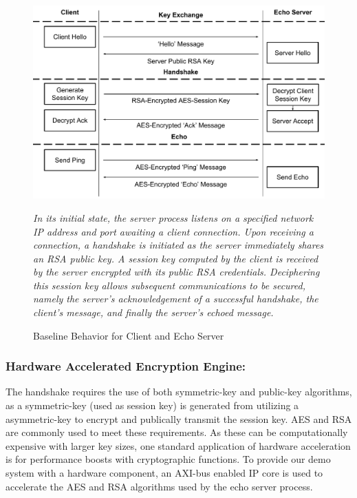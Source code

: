 \documentclass[sigconf]{acmart}
\theoremstyle{plain}
\theoremstyle{remark}
\begin{document}
\begin{figure}[]
\centering
\includegraphics[width=1\columnwidth]{figures/ProcessInteractions.pdf}
\caption{Baseline Behavior for Client and Echo Server}
\textit{In its initial state, the server process listens on a specified network IP address and port awaiting a client connection. Upon receiving a connection, a handshake is initiated as the server immediately shares an RSA public key. A session key computed by the client is received by the server encrypted with its public RSA credentials. Deciphering this session key allows subsequent communications to be secured, namely the server's acknowledgement of a successful handshake, the client's message, and finally the server's echoed message.} %
\label{fig:ProcessInteractions}
\end{figure}

\subsubsection{Hardware Accelerated Encryption Engine:}
The handshake requires the use of both symmetric-key and public-key algorithms, as a symmetric-key (used as session key) is generated from utilizing a asymmetric-key to encrypt and publically transmit the session key. AES and RSA are commonly used to meet these requirements. As these can be computationally expensive with larger key sizes, one standard application of hardware acceleration is for performance boosts with cryptographic functions. To provide our demo system with a hardware component, an AXI-bus enabled IP core is used to accelerate the AES and RSA algorithms used by the echo server process.
\end{document}
